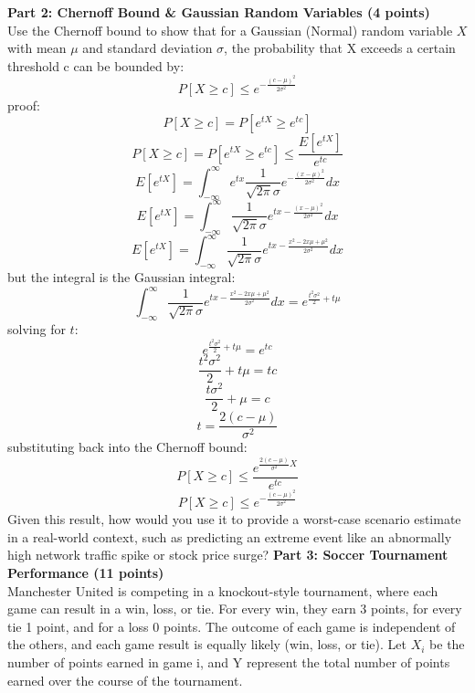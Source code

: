 \documentclass[a3paper,12pt]{extarticle} %
\begin{document}
    \subitem \textbf{Part 2: Chernoff Bound \& Gaussian Random Variables (4 points)}
    \\ Use the Chernoff bound to show that for a Gaussian (Normal) random variable \(X\) with mean \(\mu\) and
    standard deviation \(\sigma\), the probability that X exceeds a certain threshold c can be bounded by:
    \[
    P[X \geq c] \leq e^{-\frac{(c-\mu)^2}{2\sigma^2}}
    \]
    proof:
    \[
    P[X \geq c] = P[e^{tX} \geq e^{tc}]
    \]
    \[
    P[X \geq c] = P[e^{tX} \geq e^{tc}] \leq \frac{E[e^{tX}]}{e^{tc}}
    \]
    \[
    E[e^{tX}] = \int_{-\infty}^{\infty} e^{tx} \frac{1}{\sqrt{2\pi}\sigma} e^{-\frac{(x-\mu)^2}{2\sigma^2}} dx
    \]
    \[
    E[e^{tX}] = \int_{-\infty}^{\infty} \frac{1}{\sqrt{2\pi}\sigma} e^{tx - \frac{(x-\mu)^2}{2\sigma^2}} dx
    \]
    \[
    E[e^{tX}] = \int_{-\infty}^{\infty} \frac{1}{\sqrt{2\pi}\sigma} e^{tx - \frac{x^2 - 2x\mu + \mu^2}{2\sigma^2}} dx
    \]
    but the integral is the Gaussian integral:
    \[
    \int_{-\infty}^{\infty} \frac{1}{\sqrt{2\pi}\sigma} e^{tx - \frac{x^2 - 2x\mu + \mu^2}{2\sigma^2}} dx = e^{\frac{t^2\sigma^2}{2} + t\mu}
    \]
    solving for \(t\):
    \[
    e^{\frac{t^2\sigma^2}{2} + t\mu} = e^{tc}
    \]
    \[
    \frac{t^2\sigma^2}{2} + t\mu = tc
    \]
    \[
    \frac{t\sigma^2}{2} + \mu = c
    \]
    \[
    t = \frac{2(c-\mu)}{\sigma^2}
    \]
    substituting back into the Chernoff bound:
    \[
    P[X \geq c] \leq \frac{e^{\frac{2(c-\mu)}{\sigma^2}X}}{e^{tc}}
    \]
    \[
    P[X \geq c] \leq e^{-\frac{(c-\mu)^2}{2\sigma^2}}
    \]
    Given this result, how would you use it to provide a worst-case scenario estimate in a real-world context, such as predicting an extreme event like an abnormally high network traffic spike or stock price surge?
    \subitem\textbf{Part 3: Soccer Tournament Performance (11 points)}
    \\ Manchester United is competing in a knockout-style tournament, where each game can result in a win,
    loss, or tie. For every win, they earn 3 points, for every tie 1 point, and for a loss 0 points. The outcome
    of each game is independent of the others, and each game result is equally likely (win, loss, or tie). Let
    \(X_i\) be the number of points earned in game i, and Y represent the total number of points earned over
    the course of the tournament.
\end{document}
